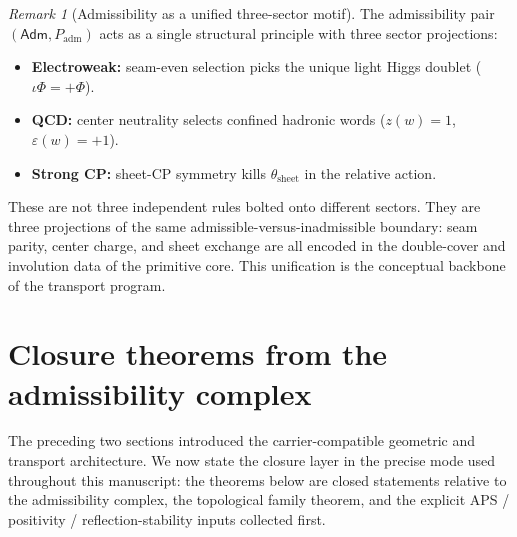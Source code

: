 \documentclass[11pt,a4paper]{article}
\theoremstyle{definition}
\theoremstyle{remark}
\newtheorem*{remark}{Remark}
\newcommand{\inv}{\iota}
\newcommand{\Padm}{P_{\mathrm{adm}}}
\begin{document}
\begin{remark}[Admissibility as a unified three-sector motif]
The admissibility pair $(\mathsf{Adm},\Padm)$ acts as a single structural principle with three sector projections:
\begin{itemize}[leftmargin=1.5em, topsep=3pt, itemsep=2pt]
    \item \textbf{Electroweak:} seam-even selection picks the unique light Higgs doublet ($\inv\Phi=+\Phi$).
    \item \textbf{QCD:} center neutrality selects confined hadronic words ($z(w)=1$, $\varepsilon(w)=+1$).
    \item \textbf{Strong CP:} sheet-CP symmetry kills $\theta_{\mathrm{sheet}}$ in the relative action.
\end{itemize}
These are not three independent rules bolted onto different sectors. They are three projections of the same admissible-versus-inadmissible boundary: seam parity, center charge, and sheet exchange are all encoded in the double-cover and involution data of the primitive core. This unification is the conceptual backbone of the transport program.
\end{remark}

\section{Closure theorems from the admissibility complex}
\label{sec:closure-theorems}

The preceding two sections introduced the carrier-compatible geometric and transport architecture. We now state the closure layer in the precise mode used throughout this manuscript: the theorems below are closed statements relative to the admissibility complex, the topological family theorem, and the explicit APS / positivity / reflection-stability inputs collected first.
\end{document}
